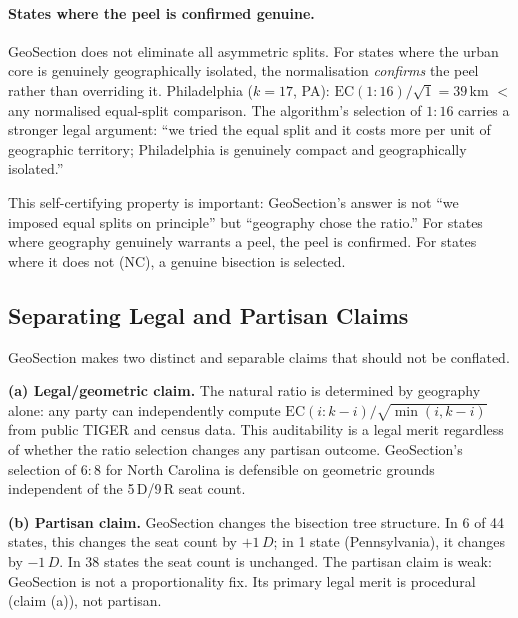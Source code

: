 \paragraph{States where the peel is confirmed genuine.}
GeoSection does not eliminate all asymmetric splits.
For states where the urban core is genuinely geographically isolated, the
normalisation \emph{confirms} the peel rather than overriding it.
Philadelphia ($k=17$, PA): $\mathrm{EC}(1:16)/\sqrt{1} = 39$\,km $<$ any
normalised equal-split comparison.
The algorithm's selection of $1:16$ carries a stronger legal argument:
``we tried the equal split and it costs more per unit of geographic territory;
Philadelphia is genuinely compact and geographically isolated.''

This self-certifying property is important: GeoSection's answer is not ``we
imposed equal splits on principle'' but ``geography chose the ratio.''
For states where geography genuinely warrants a peel, the peel is confirmed.
For states where it does not (NC), a genuine bisection is selected.

\subsection{Separating Legal and Partisan Claims}

GeoSection makes two distinct and separable claims that should not be conflated.

\textbf{(a) Legal/geometric claim.}
The natural ratio is determined by geography alone: any party can independently
compute $\mathrm{EC}(i:k-i)/\sqrt{\min(i,k-i)}$ from public TIGER and census data.
This auditability is a legal merit regardless of whether the ratio selection changes
any partisan outcome.
GeoSection's selection of $6:8$ for North Carolina is defensible on geometric grounds
independent of the 5\,D/9\,R seat count.

\textbf{(b) Partisan claim.}
GeoSection changes the bisection tree structure.
In 6 of 44 states, this changes the seat count by $+1\,D$; in 1 state (Pennsylvania),
it changes by $-1\,D$.
In 38 states the seat count is unchanged.
The partisan claim is weak: GeoSection is not a proportionality fix.
Its primary legal merit is procedural (claim (a)), not partisan.

